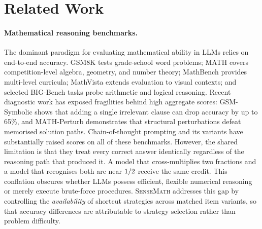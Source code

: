 \section{Related Work}
\label{sec:related}

\paragraph{Mathematical reasoning benchmarks.}
The dominant paradigm for evaluating mathematical ability in LLMs relies on end-to-end accuracy.
GSM8K \citep{cobbe2021training} tests grade-school word problems; MATH \citep{hendrycks2021measuring} covers competition-level algebra, geometry, and number theory; MathBench \citep{liu2024mathbench} provides multi-level curricula; MathVista \citep{lu2024mathvista} extends evaluation to visual contexts; and selected BIG-Bench tasks \citep{srivastava2023beyond} probe arithmetic and logical reasoning.
Recent diagnostic work has exposed fragilities behind high aggregate scores: GSM-Symbolic \citep{mirzadeh2024gsmsymbolic} shows that adding a single irrelevant clause can drop accuracy by up to 65\%, and MATH-Perturb \citep{huang2025mathperturb} demonstrates that structural perturbations defeat memorised solution paths.
Chain-of-thought prompting \citep{wei2022chain} and its variants \citep{wang2023selfconsistency,yao2023tree} have substantially raised scores on all of these benchmarks.
However, the shared limitation is that they treat every correct answer identically regardless of the reasoning path that produced it.
A model that cross-multiplies two fractions and a model that recognises both are near $\nicefrac{1}{2}$ receive the same credit.
This conflation obscures whether LLMs possess efficient, flexible numerical reasoning or merely execute brute-force procedures.
\textsc{SenseMath} addresses this gap by controlling the \emph{availability} of shortcut strategies across matched item variants, so that accuracy differences are attributable to strategy selection rather than problem difficulty.

